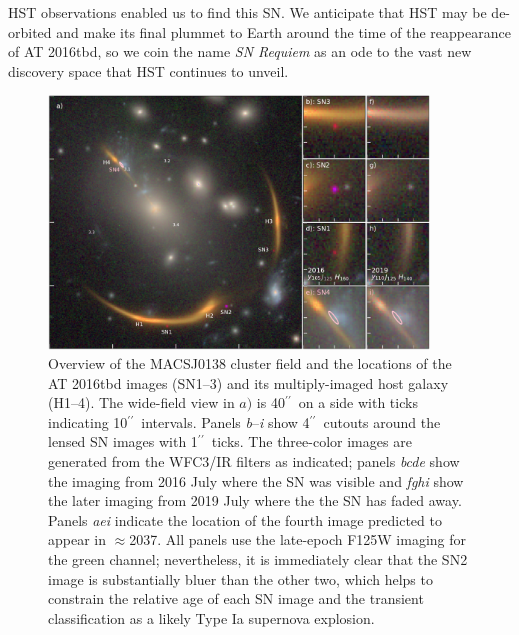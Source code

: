 \documentclass[12pt]{article}
\gdef\arcsec{$^{\prime\prime}$}
\def\TNSname{AT 2016tbd\xspace}
\def\SNABC{AT 2016tbd\xspace}
\begin{document}
HST observations enabled us to find this SN.  We anticipate that HST may be de-orbited and make its final plummet to Earth around the time of the reappearance of \TNSname, so we coin the name {\it SN  Requiem} as an ode to the vast new discovery space that HST continues to unveil.




\clearpage
\begin{figure}
    \centering
    \includegraphics[draft=False,width=0.9\textwidth]{Paper/Figures/fig1_layout_2021.pdf}
    \caption{Overview of the MACSJ0138 cluster field and the locations of the \SNABC images  (SN1--3) and its multiply-imaged host galaxy (H1--4). The wide-field view in $a)$ is 40\arcsec\ on a side with ticks indicating 10\arcsec\ intervals.  
    Panels \emph{b}--\emph{i} show 4\arcsec\ cutouts around the lensed SN images with 1\arcsec\ ticks.  The three-color images are generated from the WFC3/IR filters as indicated; panels \emph{bcde} show the imaging from 2016 July where the SN was visible and \emph{fghi} show the later imaging from 2019 July where the the SN has faded away.  Panels \emph{aei} indicate the location of the fourth image predicted to appear in $\approx$2037. All panels use the late-epoch F125W imaging for the green channel; nevertheless, it is immediately clear that the SN2 image is substantially bluer than the other two, which helps to constrain the relative age of each SN image and the transient classification as a likely Type Ia supernova explosion. }
    \label{fig:layout}
\end{figure}
\end{document}
